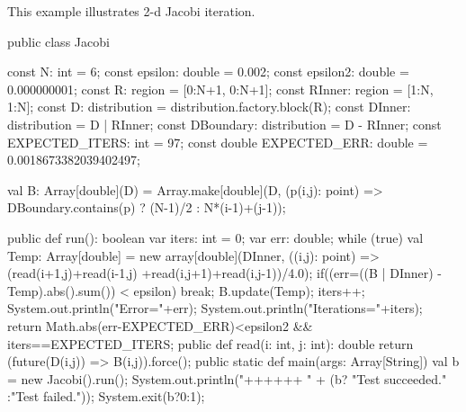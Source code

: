 
This example illustrates 2-d Jacobi iteration.

\begin{xten}
public class Jacobi {
   const N: int = 6;
   const epsilon: double = 0.002;
   const epsilon2: double = 0.000000001;
   const R: region = [0:N+1, 0:N+1];
   const RInner: region = [1:N, 1:N];
   const D: distribution = distribution.factory.block(R);
   const DInner: distribution = D | RInner;
   const DBoundary: distribution = D - RInner;
   const EXPECTED_ITERS: int  = 97;
   const double EXPECTED_ERR: double = 0.0018673382039402497;
     
   val B: Array[double](D) = Array.make[double](D,
        (p(i,j): point) => DBoundary.contains(p) ? (N-1)/2 : N*(i-1)+(j-1));
    
   public def run(): boolean {
      var iters: int = 0;
      var err: double;
      while (true) {
        val Temp: Array[double] = 
           new array[double](DInner, ((i,j): point) =>
             (read(i+1,j)+read(i-1,j) +read(i,j+1)+read(i,j-1))/4.0);
        if((err=((B | DInner) - Temp).abs().sum()) < epsilon)
           break; 
        B.update(Temp);
        iters++; 
      }
      System.out.println("Error="+err);
      System.out.println("Iterations="+iters);
      return Math.abs(err-EXPECTED_ERR)<epsilon2 
          && iters==EXPECTED_ITERS;
   }
   public def read(i: int, j: int): double {
      return (future(D(i,j)) => B(i,j)).force();
   }
   public static def main(args: Array[String]) {
      val b = new Jacobi().run();
      System.out.println("++++++ "
                         + (b? "Test succeeded."
                             :"Test failed."));
      System.exit(b?0:1);
   }
}
\end{xten}

